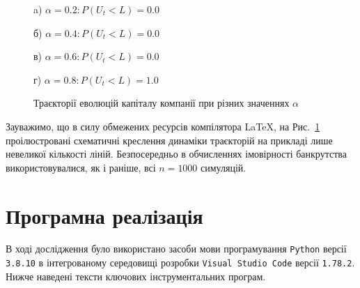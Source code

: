 \documentclass{mathreport}
\begin{document}
\begin{figure}[H]
    \begin{minipage}[H]{0.47\linewidth}\centering
        \center{} a) $\alpha=0.2 : P(U_t < L) = 0.0$
    \end{minipage} 
    \hfill
    \begin{minipage}[H]{0.47\linewidth}\centering
         б) $\alpha=0.4 : P(U_t < L) = 0.0$
    \end{minipage} 
\end{figure}

\begin{figure}[H]
    \begin{minipage}[H]{0.47\linewidth}\centering
        \center{} в) $\alpha=0.6 : P(U_t < L) = 0.0$
    \end{minipage} 
    \hfill
    \begin{minipage}[H]{0.47\linewidth}\centering
         г) $\alpha=0.8 : P(U_t < L) = 1.0$
    \end{minipage} 
    \caption{Траєкторії еволюцій капіталу компанії при різних значеннях $\alpha$}
    \label{pic: evolution alpha = 0.2,0.4,0.6,0.8}
\end{figure}

Зауважимо, що в силу обмежених ресурсів компілятора \LaTeX, на Рис.~\ref{pic: evolution alpha = 0.2,0.4,0.6,0.8} проілюстровані схематичні креслення динаміки траєкторій на прикладі лише невеликої кількості ліній. Безпосередньо в обчисленнях імовірності банкрутства використовувалися, як і раніше, всі $n=1000$ симуляцій.

\newpage
\printbibliography[title={Перелік посилань}] %

\newpage
\section*{Програмна реалізація}

В ході дослідження було використано засоби мови програмування \texttt{Python} версії \texttt{3.8.10} в інтегрованому середовищі розробки \texttt{Visual Studio Code} версії \texttt{1.78.2}. Нижче наведені тексти ключових інструментальних програм.








\end{document}
